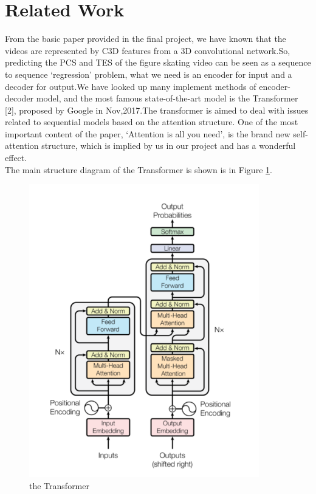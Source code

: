 \documentclass{article}
\begin{document}
\section{Related Work}
From the basic paper provided in the final project, we have known that the videos are represented by C3D features from a 3D convolutional network.So, predicting the PCS and TES of the figure skating video can be seen as a sequence to sequence `regression' problem, what we need is an encoder for input and a decoder for output.We have looked up many implement methods of encoder-decoder model, and the most famous state-of-the-art model is the Transformer [2], proposed by Google in Nov,2017.The transformer is aimed to deal with issues related to sequential models based on the attention structure. One of the most important content of the paper, `Attention is all you need', is the brand new self-attention structure, which is implied by us in our project and has a wonderful effect.\\
The main structure diagram of the Transformer is shown is in Figure \ref{transformer}.
\begin{figure}[H]
	\centering
	\includegraphics[width=10cm]{transformer}
	\caption{the Transformer}
	\label{transformer}
\end{figure}
\end{document}

